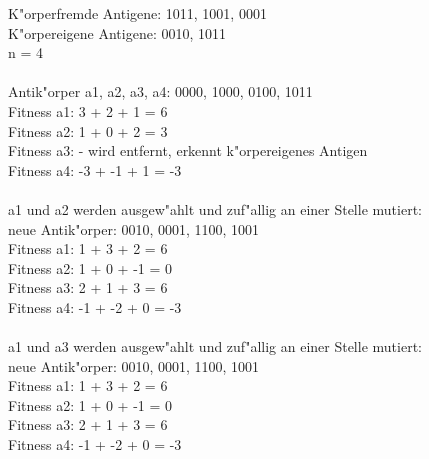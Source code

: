 \documentclass[10pt, a4]{seminar}
\begin{document}
\begin{slide}
K"orperfremde Antigene: 1011, 1001, 0001\\
K"orpereigene Antigene: 0010, 1011\\
n = 4\\
\ \\
Antik"orper a1, a2, a3, a4: 0000, 1000, 0100, 1011\\
Fitness a1: 3 + 2 + 1 = 6\\
Fitness a2: 1 + 0 + 2 = 3\\
Fitness a3: - wird entfernt, erkennt k"orpereigenes Antigen\\
Fitness a4: -3 + -1 + 1 = -3\\
\ \\
a1 und a2 werden ausgew"ahlt und zuf"allig an einer Stelle mutiert:\\
neue Antik"orper: 0010, 0001, 1100, 1001\\
Fitness a1: 1 + 3 + 2 = 6\\
Fitness a2: 1 + 0 + -1 = 0\\
Fitness a3: 2 + 1 + 3 = 6\\
Fitness a4: -1 + -2 + 0 = -3\\
\ \\
a1 und a3 werden ausgew"ahlt und zuf"allig an einer Stelle mutiert:\\
neue Antik"orper: 0010, 0001, 1100, 1001\\
Fitness a1: 1 + 3 + 2 = 6\\
Fitness a2: 1 + 0 + -1 = 0\\
Fitness a3: 2 + 1 + 3 = 6\\
Fitness a4: -1 + -2 + 0 = -3\\
\vfill
\end{slide}
\end{document}
